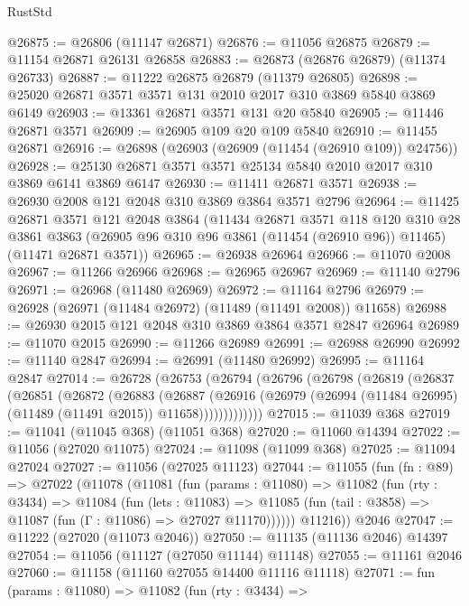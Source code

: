 \begin{lexlean}{RustStd}
\begin{coremodule}
@26875 := @26806 (@11147 @26871)
@26876 := @11056 @26875
@26879 := @11154 @26871 @26131 @26858
@26883 := @26873 (@26876 @26879) (@11374 @26733)
@26887 := @11222 @26875 @26879 (@11379 @26805)
@26898 := @25020 @26871 @3571 @3571 @131 @2010 @2017 @310 @3869 @5840 @3869 @6149
@26903 := @13361 @26871 @3571 @131 @20 @5840
@26905 := @11446 @26871 @3571
@26909 := @26905 @109 @20 @109 @5840
@26910 := @11455 @26871
@26916 := @26898 (@26903 (@26909 (@11454 (@26910 @109)) @24756))
@26928 := @25130 @26871 @3571 @3571 @25134 @5840 @2010 @2017 @310 @3869 @6141 @3869 @6147
@26930 := @11411 @26871 @3571
@26938 := @26930 @2008 @121 @2048 @310 @3869 @3864 @3571 @2796
@26964 := @11425
    @26871
    @3571
    @121
    @2048
    @3864
    (@11434
      @26871
      @3571
      @118
      @120
      @310
      @28
      @3861
      @3863
      (@26905 @96 @310 @96 @3861 (@11454 (@26910 @96)) @11465)
      (@11471 @26871 @3571))
@26965 := @26938 @26964
@26966 := @11070 @2008
@26967 := @11266 @26966
@26968 := @26965 @26967
@26969 := @11140 @2796
@26971 := @26968 (@11480 @26969)
@26972 := @11164 @2796
@26979 := @26928 (@26971 (@11484 @26972) (@11489 (@11491 @2008)) @11658)
@26988 := @26930 @2015 @121 @2048 @310 @3869 @3864 @3571 @2847 @26964
@26989 := @11070 @2015
@26990 := @11266 @26989
@26991 := @26988 @26990
@26992 := @11140 @2847
@26994 := @26991 (@11480 @26992)
@26995 := @11164 @2847
@27014 := @26728
    (@26753
      (@26794
        (@26796
          (@26798
            (@26819
              (@26837
                (@26851
                  (@26872
                    (@26883
                      (@26887
                        (@26916
                          (@26979
                            (@26994 (@11484 @26995) (@11489 (@11491 @2015)) @11658)))))))))))))
@27015 := @11039 @368
@27019 := @11041 (@11045 @368) (@11051 @368)
@27020 := @11060 @14394
@27022 := @11056 (@27020 @11075)
@27024 := @11098 (@11099 @368)
@27025 := @11094 @27024
@27027 := @11056 (@27025 @11123)
@27044 := @11055
    (fun (fn : @89) =>
    @27022
      (@11078
        (@11081
          (fun (params : @11080) =>
          @11082
            (fun (rty : @3434) =>
            @11084
              (fun (lets : @11083) =>
              @11085 (fun (tail : @3858) => @11087 (fun (Γ : @11086) => @27027 @11170))))))
        @11216))
    @2046
@27047 := @11222 (@27020 (@11073 @2046))
@27050 := @11135 (@11136 @2046) @14397
@27054 := @11056 (@11127 (@27050 @11144) @11148)
@27055 := @11161 @2046
@27060 := @11158 (@11160 @27055 @14400 @11116 @11118)
@27071 := fun (params : @11080) =>
  @11082
    (fun (rty : @3434) =>

\end{coremodule}
\end{lexlean}
